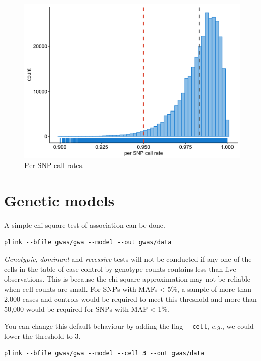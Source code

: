 \documentclass[
]{book}
\newcommand{\passthrough}[1]{#1}
\begin{document}
\begin{figure}[H]

{\centering \includegraphics[width=18.67in]{img/_gwas_dummy/show-snp-callrate-gwas} 

}

\caption{Per SNP call rates.}\label{fig:show-snp-callrate-gwas}
\end{figure}

\hypertarget{genetic-models}{%
\section{Genetic models}\label{genetic-models}}

A simple chi-square test of association can be done.

\begin{lstlisting}
plink --bfile gwas/gwa --model --out gwas/data
\end{lstlisting}

\emph{Genotypic}, \emph{dominant} and \emph{recessive} tests will not be conducted if any one of the cells in the table of case-control by genotype counts contains less than five observations. This is because the chi-square approximation may not be reliable when cell counts are small. For SNPs with MAFs \textless{} 5\%, a sample of more than 2,000 cases and controls would be required to meet this threshold and more than 50,000 would be required for SNPs with MAF \textless{} 1\%.

You can change this default behaviour by adding the flag \passthrough{\lstinline!--cell!}, \emph{e.g.}, we could lower the threshold to 3.

\begin{lstlisting}
plink --bfile gwas/gwa --model --cell 3 --out gwas/data
\end{lstlisting}
\end{document}
